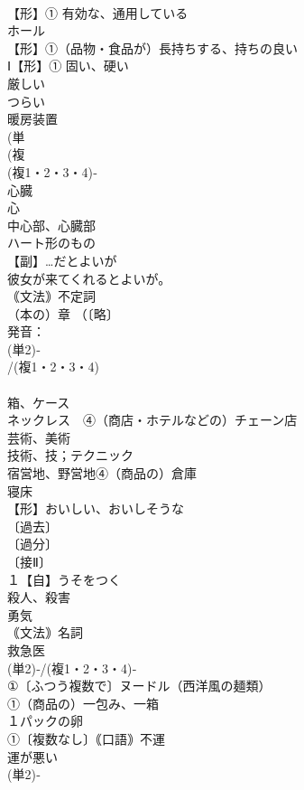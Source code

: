 \documentclass[8pt]{extreport}
\begin{document}
\begin{CJK}{UTF8}{min}
\\	【形】① 有効な、通用している 
\\	ホール 
\\	【形】①（品物・食品が）長持ちする、持ちの良い 
\\	Ⅰ【形】① 固い、硬い 
\\	厳しい　
\\	つらい
\\	暖房装置 
\\	(単
\\	(複
\\	(複1・2・3・4)‐
\\	心臓 
\\	心　
\\	中心部、心臓部　
\\	ハート形のもの
\\	【副】…だとよいが 
\\	彼女が来てくれるとよいが。
\\	｟文法｠不定詞
\\	（本の）章 （〔略〕
\\	発音：
\\	(単2)‐
\\	/(複1・2・3・4)
\\	[まれに(複1)‐] 
\\	箱、ケース 
\\	ネックレス　④（商店・ホテルなどの）チェーン店
\\	芸術、美術 
\\	技術、技；テクニック
\\	宿営地、野営地④（商品の）倉庫　
\\	寝床 
\\	【形】おいしい、おいしそうな
\\	〔過去〕
\\	〔過分〕
\\	〔接Ⅱ〕
\\	１【自】うそをつく 
\\	殺人、殺害 
\\	勇気 
\\	｟文法｠名詞
\\	救急医
\\	(単2)‐/(複1・2・3・4)‐
\\	①〔ふつう複数で〕ヌードル（西洋風の麺類）
\\	①（商品の）一包み、一箱 
\\	１パックの卵
\\	①〔複数なし〕｟口語｠不運 
\\	運が悪い 
\\	(単2)‐

\end{CJK}
\end{document}
